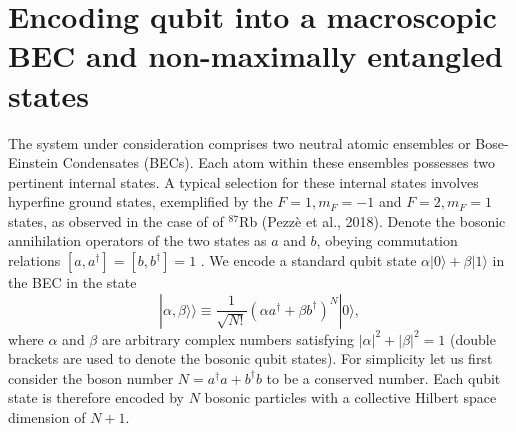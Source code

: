 \documentclass[
aps,%
12pt,%
final,%
notitlepage,%
oneside,%
onecolumn,%
nobibnotes,%
nofootinbib,%
superscriptaddress,%
noshowpacs,%
centertags]%
{revtex4}
\begin{document}
\section{Encoding qubit into a macroscopic BEC and non-maximally entangled states}

The system under consideration comprises two neutral atomic ensembles or Bose-Einstein Condensates (BECs). Each atom within these ensembles possesses two pertinent internal states. A typical selection for these internal states involves hyperfine ground states, exemplified by the $ F= 1, m_F = - 1 $ and $ F = 2, m_F = 1 $ states, as observed in the case of of $^{87}$Rb (Pezzè et al., 2018). Denote the bosonic annihilation operators of the two states as $ a $ and $ b $, obeying commutation relations $ [a,a^\dagger]= [b,b^\dagger]= 1 $ \cite{li2009spin}. We encode a standard qubit state $ \alpha | 0 \rangle + \beta |1 \rangle $ in the BEC in the state
%
\begin{equation}
\label{singlequbitstate}
|\alpha, \beta \rangle \rangle \equiv \frac{1}{\sqrt{N!}} \left( \alpha a^\dagger + \beta b^\dagger \right)^N |0 \rangle ,
\end{equation}
%
where $ \alpha $ and $ \beta $ are arbitrary complex numbers satisfying $ |\alpha |^2 + | \beta |^2 = 1 $
(double brackets are used to denote the bosonic qubit states).  For simplicity let us first consider the boson number $ N = a^\dagger a + b^\dagger b $ to be a conserved number. Each qubit state is therefore encoded by $ N $ bosonic particles with a collective Hilbert space dimension of $ N+1 $.
\end{document}
